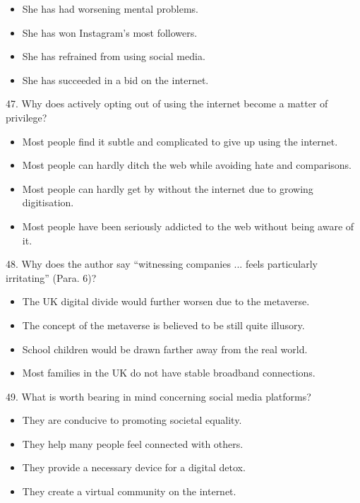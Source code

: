 \documentclass[UTF8,11pt]{ctexart}
\begin{document}
\begin{itemize}[leftmargin=2em,itemsep=.2em,topsep=.4em]\item[A.] She has had worsening mental problems.
\item[B.] She has won Instagram’s most followers.
\item[C.] She has refrained from using social media.
\item[D.] She has succeeded in a bid on the internet.
\end{itemize}

47. Why does actively opting out of using the internet become a matter of privilege?


\begin{itemize}[leftmargin=2em,itemsep=.2em,topsep=.4em]\item[A.] Most people find it subtle and complicated to give up using the internet.
\item[B.] Most people can hardly ditch the web while avoiding hate and comparisons.
\end{itemize}

\begin{itemize}[leftmargin=2em,itemsep=.2em,topsep=.4em]\item[C.] Most people can hardly get by without the internet due to growing digitisation.
\item[D.] Most people have been seriously addicted to the web without being aware of it.
\end{itemize}

48. Why does the author say “witnessing companies ... feels particularly irritating” (Para. 6)?


\begin{itemize}[leftmargin=2em,itemsep=.2em,topsep=.4em]\item[A.] The UK digital divide would further worsen due to the metaverse.
\item[B.] The concept of the metaverse is believed to be still quite illusory.
\item[C.] School children would be drawn farther away from the real world.
\item[D.] Most families in the UK do not have stable broadband connections.
\end{itemize}

49. What is worth bearing in mind concerning social media platforms?


\begin{itemize}[leftmargin=2em,itemsep=.2em,topsep=.4em]\item[A.] They are conducive to promoting societal equality.
\item[B.] They help many people feel connected with others.
\item[C.] They provide a necessary device for a digital detox.
\item[D.] They create a virtual community on the internet.
\end{itemize}
\end{document}
